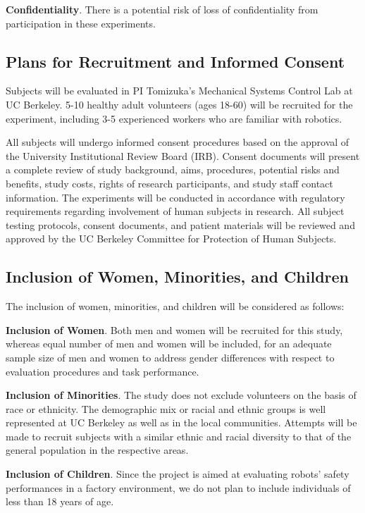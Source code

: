 \textbf{Confidentiality}. There is a potential risk of loss of confidentiality from participation in these experiments.

\subsection{Plans for Recruitment and Informed Consent}
Subjects will be evaluated in PI Tomizuka's Mechanical Systems Control Lab at UC Berkeley. 5-10 healthy adult volunteers (ages 18-60) will be recruited for the experiment, including 3-5 experienced workers who are familiar with robotics.

All subjects will undergo informed consent procedures based on the approval of the University Institutional Review Board (IRB). Consent documents will present a complete review of study background, aims, procedures, potential risks and benefits, study costs, rights of research participants, and study staff contact information. The experiments will be conducted in accordance with regulatory requirements regarding involvement of human subjects in research. All subject testing protocols, consent documents, and patient materials will be reviewed and approved by the UC Berkeley Committee for Protection of Human Subjects.

\subsection{Inclusion of Women, Minorities, and Children}
The inclusion of women, minorities, and children will be considered as follows:

\textbf{Inclusion of Women}. Both men and women will be recruited for this study, whereas equal number of
men and women will be included, for an adequate sample size of men and women to address gender differences with respect to evaluation procedures and task performance.

\textbf{Inclusion of Minorities}. The study does not exclude volunteers on the basis of race or ethnicity. The demographic mix or racial and ethnic groups is well represented at UC Berkeley as well as in the local communities. Attempts will be made to recruit subjects with a similar ethnic and racial diversity to that of the general population in the respective areas.

\textbf{Inclusion of Children}. Since the project is aimed at evaluating robots' safety performances in a factory environment, we do not plan to include individuals of less than 18 years of age.


